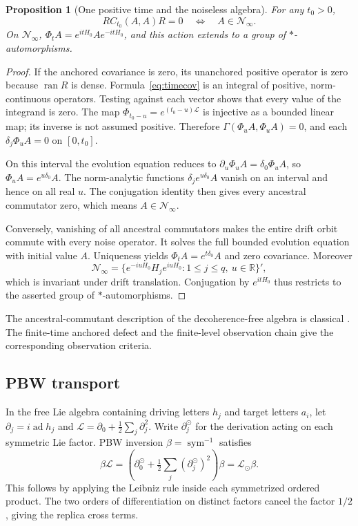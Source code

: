 \documentclass[11pt,a4paper]{amsart}
\numberwithin{equation}{section}
\newtheorem{proposition}[theorem]{Proposition}
\theoremstyle{definition}
\theoremstyle{remark}
\newcommand{\R}{\mathbb R}
\DeclareMathOperator{\ran}{ran}
\DeclareMathOperator{\sym}{sym}
\DeclareMathOperator{\ad}{ad}
\begin{document}
\begin{proposition}[One positive time and the noiseless algebra]\label{prop:noiseless_algebra}
For any $t_0>0$,
\begin{equation}\label{eq:noiseless_iff}
 RC_{t_0}(A,A)R=0\quad\Longleftrightarrow\quad A\in\mathcal N_\infty.
\end{equation}
On $\mathcal N_\infty$, $\Phi_tA=e^{itH_0}Ae^{-itH_0}$, and this action extends to a group of $*$-automorphisms.
\end{proposition}
\begin{proof}
If the anchored covariance is zero, its unanchored positive operator is zero because $\ran R$ is dense. Formula~\eqref{eq:timecov} is an integral of positive, norm-continuous operators. Testing against each vector shows that every value of the integrand is zero. The map $\Phi_{t_0-u}=e^{(t_0-u)\mathcal L}$ is injective as a bounded linear map; its inverse is not assumed positive. Therefore $\Gamma(\Phi_uA,\Phi_uA)=0$, and each $\delta_j\Phi_uA=0$ on $[0,t_0]$.

On this interval the evolution equation reduces to $\partial_u\Phi_uA=\delta_0\Phi_uA$, so $\Phi_uA=e^{u\delta_0}A$. The norm-analytic functions $\delta_je^{u\delta_0}A$ vanish on an interval and hence on all real $u$. The conjugation identity then gives every ancestral commutator zero, which means $A\in\mathcal N_\infty$.

Conversely, vanishing of all ancestral commutators makes the entire drift orbit commute with every noise operator. It solves the full bounded evolution equation with initial value $A$. Uniqueness yields $\Phi_tA=e^{t\delta_0}A$ and zero covariance. Moreover
\[
 \mathcal N_\infty
 =\{e^{-iuH_0}H_je^{iuH_0}:1\le j\le q,\ u\in\R\}',
\]
which is invariant under drift translation. Conjugation by $e^{itH_0}$ thus restricts to the asserted group of $*$-automorphisms.
\end{proof}
The ancestral-commutant description of the decoherence-free algebra is classical \cite[Proposition~3]{DFSU}. The finite-time anchored defect and the finite-level observation chain give the corresponding observation criteria.

\subsection{PBW transport}
In the free Lie algebra containing driving letters $h_j$ and target letters $a_i$, let $\partial_j=i\ad h_j$ and $\mathscr L=\partial_0+\frac12\sum_j\partial_j^2$. Write $\partial_j^\odot$ for the derivation acting on each symmetric Lie factor. PBW inversion $\beta=\sym^{-1}$ satisfies
\begin{equation}\label{eq:time_pbw}
 \beta\mathscr L=
 \left(\partial_0^\odot+\tfrac12\sum_j(\partial_j^\odot)^2\right)\beta
 =\mathscr L_\odot\beta.
\end{equation}
This follows by applying the Leibniz rule inside each symmetrized ordered product. The two orders of differentiation on distinct factors cancel the factor $1/2$, giving the replica cross terms.
\end{document}
